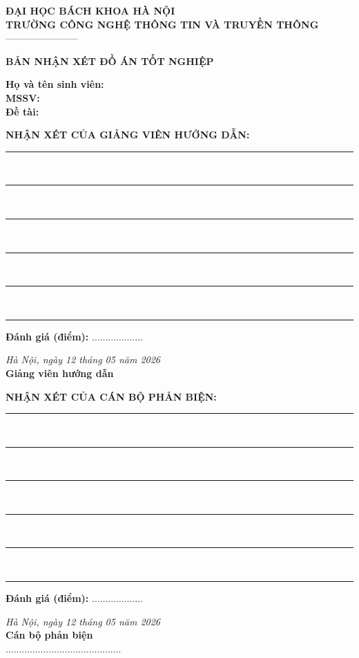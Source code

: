\documentclass[../main.tex]{subfiles}
\begin{document}
\begin{center}
    \textbf{ĐẠI HỌC BÁCH KHOA HÀ NỘI} \\
    \textbf{TRƯỜNG CÔNG NGHỆ THÔNG TIN VÀ TRUYỀN THÔNG} \\
    -----------------------
\end{center}

\vspace{1cm}
\begin{center}
    \textbf{\huge BẢN NHẬN XÉT ĐỒ ÁN TỐT NGHIỆP}
\end{center}

\vspace{0.5cm}
\noindent \textbf{Họ và tên sinh viên:} \AUTHOR \\
\noindent \textbf{MSSV:} \STUDENTID \\
\noindent \textbf{Đề tài:} \PROJECTTITLE

\vspace{0.5cm}
\noindent \textbf{NHẬN XÉT CỦA GIẢNG VIÊN HƯỚNG DẪN:} \\
\rule{\textwidth}{0.1pt} \\
\rule{\textwidth}{0.1pt} \\
\rule{\textwidth}{0.1pt} \\
\rule{\textwidth}{0.1pt} \\
\rule{\textwidth}{0.1pt} \\
\rule{\textwidth}{0.1pt}

\vspace{0.5cm}
\noindent \textbf{Đánh giá (điểm):} ...................

\vspace{1.5cm}
\begin{flushright}
    \textit{Hà Nội, ngày 12 tháng 05 năm 2026} \\
    \textbf{Giảng viên hướng dẫn} \\
    \vspace{2cm}
    \textbf{\INSTRUCTOR}
\end{flushright}

\newpage
\noindent \textbf{NHẬN XÉT CỦA CÁN BỘ PHẢN BIỆN:} \\
\rule{\textwidth}{0.1pt} \\
\rule{\textwidth}{0.1pt} \\
\rule{\textwidth}{0.1pt} \\
\rule{\textwidth}{0.1pt} \\
\rule{\textwidth}{0.1pt} \\
\rule{\textwidth}{0.1pt}

\vspace{0.5cm}
\noindent \textbf{Đánh giá (điểm):} ...................

\vspace{1.5cm}
\begin{flushright}
    \textit{Hà Nội, ngày 12 tháng 05 năm 2026} \\
    \textbf{Cán bộ phản biện} \\
    \vspace{2cm}
    ...........................................
\end{flushright}
\end{document}
